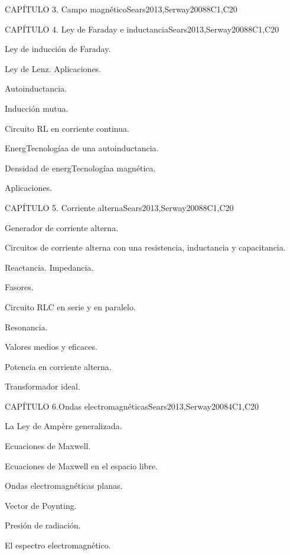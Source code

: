 \begin{syllabus}
\begin{unit}{CAPÍTULO 3. Campo magnético}{}{Sears2013,Serway2008}{8}{C1,C20}
\end{unit}

\begin{unit}{CAPÍTULO 4. Ley de Faraday e inductancia}{}{Sears2013,Serway2008}{8}{C1,C20}
\begin{topics}
      \item Ley de inducción de Faraday.
      \item Ley de Lenz. Aplicaciones.
      \item Autoinductancia.
      \item Inducción mutua.
      \item Circuito RL en corriente continua.
      \item EnergTecnologíaa de una autoinductancia.
      \item Densidad de energTecnologíaa magnética.
      \item Aplicaciones.
   \end{topics}

\end{unit}

\begin{unit}{CAPÍTULO 5. Corriente alterna}{}{Sears2013,Serway2008}{8}{C1,C20}
\begin{topics}
	\item Generador de corriente alterna.
	\item Circuitos de corriente alterna con una resistencia, inductancia y capacitancia.
	\item Reactancia. Impedancia.
	\item Fasores.
	\item Circuito RLC en serie y en paralelo.
           \item Resonancia.
           \item Valores medios y eficaces.
           \item Potencia en corriente alterna.
           \item Transformador ideal.
   \end{topics}

\end{unit}

\begin{unit}{CAPÍTULO 6.Ondas electromagnéticas}{}{Sears2013,Serway2008}{4}{C1,C20}
   \begin{topics}
	\item La Ley de Ampère generalizada.
	\item Ecuaciones de Maxwell.
	\item Ecuaciones de Maxwell en el espacio libre.
	\item Ondas electromagnéticas planas.
	\item Vector de Poynting.
	\item Presión de radiación.
	\item El espectro electromagnético.
   \end{topics}
\end{unit}



\begin{coursebibliography}
\end{coursebibliography}

\end{syllabus}
